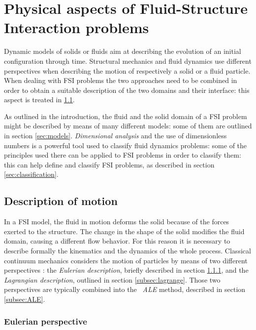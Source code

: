 \chapter{Physical aspects of Fluid-Structure Interaction problems}
\label{cha:physics}


Dynamic models of solids or fluids aim at describing the evolution of an initial configuration through time. Structural mechanics and fluid dynamics use different perspectives when describing the motion of respectively a solid or a fluid particle. When dealing with FSI problems the two approaches need to be combined in order to obtain a suitable description of the two domains and their interface: this aspect is treated in \ref{sec:desc-motion}.

As outlined in the introduction, the fluid and the solid domain of a FSI problem might be described by means of many different models: some of them are outlined in section \ref{sec:models}.  \textit{Dimensional analysis} and the use of dimensionless numbers is a powerful tool used to classify fluid dynamics problems: some of the principles used there can be applied to FSI problems in order to classify them: this can help define and classify FSI problems, as described in section \ref{sec:classification}.

\section{Description of motion}
\label{sec:desc-motion}

In a FSI model, the fluid in motion deforms the solid because of the forces exerted to the structure. The change in the shape of the solid modifies the fluid domain, causing a different flow behavior. For this reason it is necessary to describe formally the kinematics and the dynamics of the whole process. Classical continuum mechanics considers the motion of particles by means of two different perspectives  \cite{batra2006elements}: the \textit{Eulerian description}, briefly described in section \ref{subsec:euler}, and the \textit{Lagrangian description}, outlined in section \ref{subsec:lagrange}. Those two perspectives are typically combined into the \textit{~\ac{ALE}} method, described in section \ref{subsec:ALE}.

\subsection{Eulerian perspective}
\label{subsec:euler}

